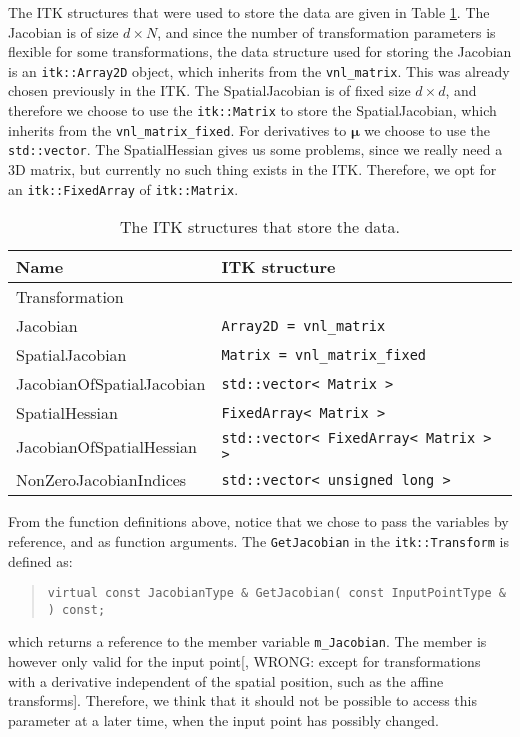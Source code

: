 \documentclass[]{article}
\newcommand{\vmu}{\bm{\mu}}
\begin{document}
The ITK structures that were used to store the data are given in
Table \ref{tab:datastructures}. The Jacobian is of size $d \times
N$, and since the number of transformation parameters is flexible
for some transformations, the data structure used for storing the
Jacobian is an \texttt{itk::Array2D} object, which inherits from the
\texttt{vnl\_matrix}. This was already chosen previously in the ITK.
The SpatialJacobian is of fixed size $d \times d$, and therefore we
choose to use the \texttt{itk::Matrix} to store the SpatialJacobian,
which inherits from the \texttt{vnl\_matrix\_fixed}. For derivatives
to $\vmu$ we choose to use the \texttt{std::vector}. The
SpatialHessian gives us some problems, since we really need a 3D
matrix, but currently no such thing exists in the ITK. Therefore, we
opt for an \texttt{itk::FixedArray} of \texttt{itk::Matrix}.

\begin{table}[h]
\centering
\begin{tabular}{ll}
\toprule \toprule
Name & ITK structure \\
\midrule Transformation &  \\
Jacobian & \texttt{Array2D = vnl\_matrix} \\
SpatialJacobian & \texttt{Matrix = vnl\_matrix\_fixed} \\
JacobianOfSpatialJacobian & \texttt{std::vector< Matrix >} \\
SpatialHessian & \texttt{FixedArray< Matrix >}\footnotemark \\
JacobianOfSpatialHessian & \texttt{std::vector< FixedArray< Matrix > >} \\
NonZeroJacobianIndices & \texttt{std::vector< unsigned long >} \\
\bottomrule \bottomrule
\end{tabular}
\caption{The ITK structures that store the
data.}\label{tab:datastructures}
\end{table}

From the function definitions above, notice that we chose to pass
the variables by reference, and as function arguments. The
\texttt{GetJacobian} in the \texttt{itk::Transform} is defined as:
\begin{quote}
\begin{verbatim}
virtual const JacobianType & GetJacobian( const InputPointType & ) const;
\end{verbatim}
\end{quote}
which returns a reference to the member variable
\texttt{m\_Jacobian}. The member is however only valid for the input
point[, WRONG: except for transformations with a derivative
independent of the spatial position, such as the affine transforms].
Therefore, we think that it should not be possible to access this
parameter at a later time, when the input point has possibly
changed.
\end{document}
